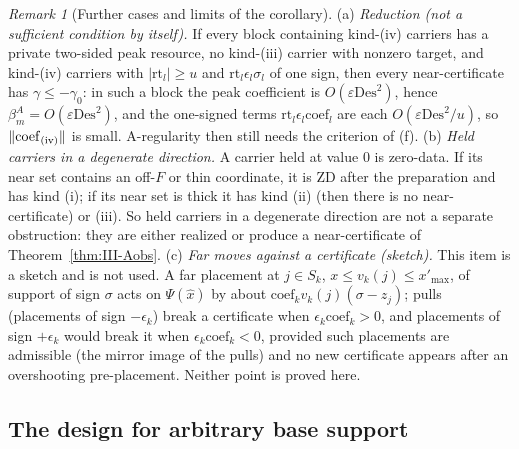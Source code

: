 \documentclass[10pt]{amsart}
\theoremstyle{definition}
\theoremstyle{remark}
\newtheorem{remark}[theorem]{Remark}
\begin{document}
\begin{remark}[Further cases and limits of the corollary]\label{rem:III-Asuff}
(a) \emph{Reduction (not a sufficient condition by itself).}  If every block
containing kind-(iv) carriers has a private two-sided peak resource, no
kind-(iii) carrier with nonzero target, and kind-(iv) carriers with
$|\mathrm{rt}_l|\ge u$ and $\mathrm{rt}_l\epsilon_l\sigma_l$ of one sign, then every
near-certificate has $\gamma\le-\gamma_0$: in such a block the peak coefficient
is $O(\varepsilon\mathrm{Des}^2)$, hence $\beta^A_m=O(\varepsilon\mathrm{Des}^2)$, and
the one-signed terms $\mathrm{rt}_l\epsilon_l\mathrm{coef}_l$ are each
$O(\varepsilon\mathrm{Des}^2/u)$, so $\|\mathrm{coef}_{\rm (iv)}\|$ is small.  A-regularity
then still needs the criterion of (f).
(b) \emph{Held carriers in a degenerate direction.}  A carrier held at value $0$
is zero-data.  If its near set contains an off-$F$ or thin coordinate, it is ZD
after the preparation and has kind (i); if its near set is thick it has kind
(ii) (then there is no near-certificate) or (iii).  So held carriers in a
degenerate direction are not a separate obstruction: they are either realized
or produce a near-certificate of Theorem~\ref{thm:III-Aobs}.
(c) \emph{Far moves against a certificate (sketch).}  This item is a sketch and
is not used.  A far placement at $j\in S_k$, $x\le v_k(j)\le x'_{\max}$, of
support of sign $\sigma$ acts on $\Psi(\hat x)$ by about $\mathrm{coef}_kv_k(j)
(\sigma-z_j)$; pulls (placements of sign $-\epsilon_k$) break a certificate when
$\epsilon_k\mathrm{coef}_k>0$, and placements of sign $+\epsilon_k$ would break it
when $\epsilon_k\mathrm{coef}_k<0$, provided such placements are admissible (the
mirror image of the pulls) and no new certificate appears after an overshooting
pre-placement.  Neither point is proved here.
\end{remark}

\subsection{The design for arbitrary base support}\label{subsec:III-designinf}
\end{document}
